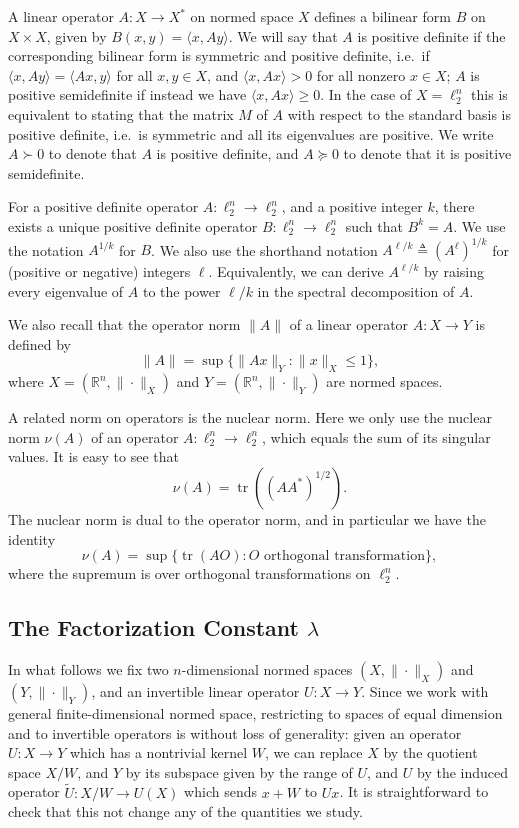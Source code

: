 \documentclass[11pt]{article}
\newcommand{\R}{{\mathbb{R}}}
\newcommand{\eqdef}{\triangleq}
\DeclareMathOperator{\tr}{tr}
\begin{document}
A linear operator $A: X \to X^*$ on normed space $X$ defines a
bilinear form $B$ on $X \times X$, given by $B(x,y) = \langle x, Ay
\rangle$. We will say that $A$ is positive definite if the
corresponding bilinear form is symmetric and positive definite,
i.e.~if $\langle x, Ay \rangle = \langle Ax, y\rangle$ for all $x,y
\in X$, and $\langle x, Ax \rangle >0$ for all nonzero $x \in X$; $A$
is positive semidefinite if instead we have $\langle x, Ax \rangle \ge
0.$ In the case of $X = \ell_2^n$ this is equivalent to stating that
the matrix $M$ of $A$ with respect to the standard basis is positive
definite, i.e.~is symmetric and all its eigenvalues are positive. We
write $A \succ 0$ to denote that $A$ is positive definite, and $A
\succeq 0$ to denote that it is positive semidefinite.

For a positive definite operator $A:\ell_2^n \to \ell_2^n$, and a
positive integer $k$, there exists a unique positive definite operator
$B:\ell_2^n \to \ell_2^n$ such that $B^k = A$. We use the notation
$A^{1/k}$ for $B$. We also use the shorthand notation $A^{\ell/k} \eqdef
(A^\ell)^{1/k}$ for (positive or negative) integers
$\ell$. Equivalently, we can derive $A^{\ell/k}$ by raising every
eigenvalue of $A$ to the power $\ell/k$ in the spectral decomposition
of $A$.

We also recall that the operator norm $\|A\|$ of a linear operator
$A:X \to Y$ is defined by 
\[
\|A\| = \sup\{\|Ax\|_Y: \|x\|_X \le 1\},
\]
where $X = (\R^n, \|\cdot\|_X)$ and $Y = (\R^n, \|\cdot\|_Y)$ are
normed spaces. 

A related norm on operators is the nuclear norm. Here we only use the
nuclear norm $\nu(A)$ of an operator $A:\ell_2^n \to \ell_2^n$, which
equals the sum of its singular values. It is easy to see that
\[
\nu(A) = \tr((AA^*)^{1/2}).
\]
The nuclear norm is dual to the operator norm, and in particular we
have the identity
\[
\nu(A) = \sup\{\tr(AO): O \text{ orthogonal transformation}\},
\]
where the supremum is over orthogonal transformations on $\ell_2^n$. 



\subsection{The Factorization Constant $\lambda$}

In what follows we fix two $n$-dimensional normed spaces $(X,
\|\cdot\|_X)$ and $(Y,\|\cdot\|_Y)$, and an invertible linear operator
$U:X \to Y$. Since we work with general finite-dimensional normed
space, restricting to spaces of equal dimension and to invertible
operators is without loss of generality: given an operator $U:X \to Y$
which has a nontrivial kernel $W$, we can replace $X$ by the
quotient space $X/W$, and $Y$ by its subspace given by the range of
$U$, and $U$ by the induced operator $\tilde{U}:X/W \to U(X)$ which
sends $x+W$ to $Ux$. It is straightforward to check that this not
change any of the quantities we study.
\end{document}
